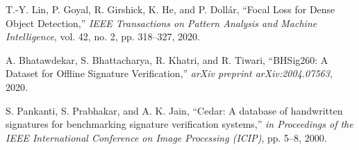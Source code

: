 \documentclass{article}
\begin{document}
\begin{thebibliography}{10}
	T.-Y. Lin, P. Goyal, R. Girshick, K. He, and P. Dollár,
	``Focal Loss for Dense Object Detection,''
	\emph{IEEE Transactions on Pattern Analysis and Machine Intelligence},
	vol. 42, no. 2, pp. 318--327, 2020.

	A. Bhatawdekar, S. Bhattacharya, R. Khatri, and R. Tiwari,
	``BHSig260: A Dataset for Offline Signature Verification,''
	\emph{arXiv preprint arXiv:2004.07563},
	2020.

	S. Pankanti, S. Prabhakar, and A. K. Jain,
	``Cedar: A database of handwritten signatures for benchmarking signature verification systems,''
	\emph{in Proceedings of the IEEE International Conference on Image Processing (ICIP)},
	pp. 5--8, 2000.

\end{thebibliography}
\end{document}
